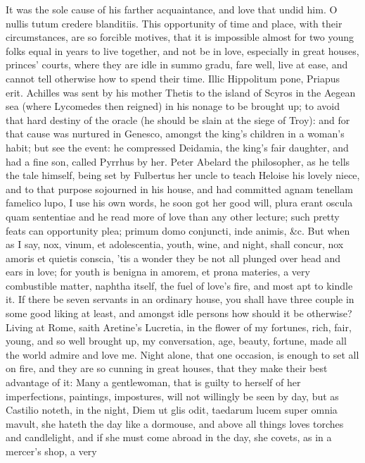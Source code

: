 {It was the sole cause of his farther acquaintance, and love that undid
him. O nullis tutum credere blanditiis.
This opportunity of time and place, with their circumstances, are so
forcible motives, that it is impossible almost for two young folks
equal in years to live together, and not be in love, especially in
great houses, princes' courts, where they are idle in summo gradu, fare
well, live at ease, and cannot tell otherwise how to spend their time.
Illic Hippolitum pone, Priapus erit. Achilles was sent by his
mother Thetis to the island of Scyros in the Aegean sea (where
Lycomedes then reigned) in his nonage to be brought up; to avoid that
hard destiny of the oracle (he should be slain at the siege of Troy):
and for that cause was nurtured in Genesco, amongst the king's children
in a woman's habit; but see the event: he compressed Deidamia, the
king's fair daughter, and had a fine son, called Pyrrhus by her. Peter
Abelard the philosopher, as he tells the tale himself, being set by
Fulbertus her uncle to teach Heloise his lovely niece, and to that
purpose sojourned in his house, and had committed agnam tenellam
famelico lupo, I use his own words, he soon got her good will, plura
erant oscula quam sententiae and he read more of love than any other
lecture; such pretty feats can opportunity plea; primum domo conjuncti,
inde animis, \&c. But when as I say, nox, vinum, et adolescentia, youth,
wine, and night, shall concur, nox amoris et quietis conscia, 'tis a
wonder they be not all plunged over head and ears in love; for youth is
benigna in amorem, et prona materies, a very combustible matter,
naphtha itself, the fuel of love's fire, and most apt to kindle it. If
there be seven servants in an ordinary house, you shall have three
couple in some good liking at least, and amongst idle persons how
should it be otherwise? Living at Rome, saith Aretine's Lucretia,
in the flower of my fortunes, rich, fair, young, and so well brought
up, my conversation, age, beauty, fortune, made all the world admire
and love me. Night alone, that one occasion, is enough to set all on
fire, and they are so cunning in great houses, that they make their
best advantage of it: Many a gentlewoman, that is guilty to herself of
her imperfections, paintings, impostures, will not willingly be seen by
day, but as Castilio noteth, in the night, Diem ut glis odit,
taedarum lucem super omnia mavult, she hateth the day like a dormouse,
and above all things loves torches and candlelight, and if she must
come abroad in the day, she covets, as in a mercer's shop, a very
}
